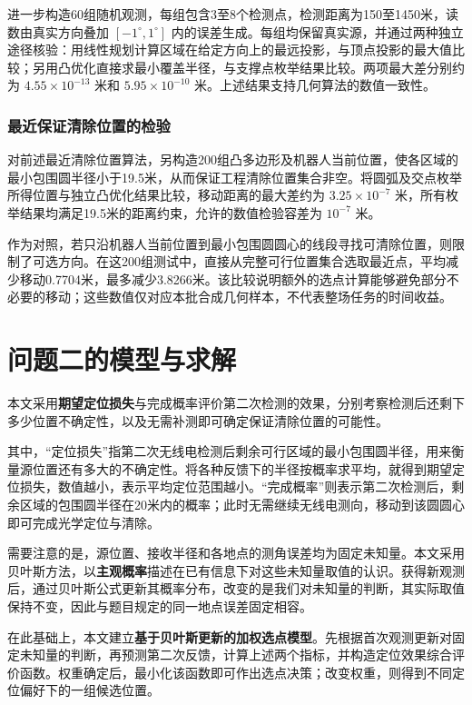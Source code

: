 \documentclass[UTF8,a4paper,zihao=-4,fontset=none]{ctexart}
\begin{document}
进一步构造60组随机观测，每组包含3至8个检测点，检测距离为150至1450米，读数由真实方向叠加 \([-1^\circ,1^\circ]\) 内的误差生成。每组均保留真实源，并通过两种独立途径核验：用线性规划计算区域在给定方向上的最远投影，与顶点投影的最大值比较；另用凸优化直接求最小覆盖半径，与支撑点枚举结果比较。两项最大差分别约为 \(4.55\times10^{-13}\) 米和 \(5.95\times10^{-10}\) 米。上述结果支持几何算法的数值一致性。

\subsubsection{最近保证清除位置的检验}

对前述最近清除位置算法，另构造200组凸多边形及机器人当前位置，使各区域的最小包围圆半径小于19.5米，从而保证工程清除位置集合非空。将圆弧及交点枚举所得位置与独立凸优化结果比较，移动距离的最大差约为 \(3.25\times10^{-7}\) 米，所有枚举结果均满足19.5米的距离约束，允许的数值检验容差为 \(10^{-7}\) 米。

作为对照，若只沿机器人当前位置到最小包围圆圆心的线段寻找可清除位置，则限制了可选方向。在这200组测试中，直接从完整可行位置集合选取最近点，平均减少移动0.7704米，最多减少3.8266米。该比较说明额外的选点计算能够避免部分不必要的移动；这些数值仅对应本批合成几何样本，不代表整场任务的时间收益。

\section{问题二的模型与求解}

本文采用\textbf{期望定位损失}与{完成概率}评价第二次检测的效果，分别考察检测后还剩下多少位置不确定性，以及无需补测即可确定保证清除位置的可能性。

其中，“定位损失”指第二次无线电检测后剩余可行区域的最小包围圆半径，用来衡量源位置还有多大的不确定性。将各种反馈下的半径按概率求平均，就得到期望定位损失，数值越小，表示平均定位范围越小。“完成概率”则表示第二次检测后，剩余区域的包围圆半径在20米内的概率；此时无需继续无线电测向，移动到该圆圆心即可完成光学定位与清除。

需要注意的是，源位置、接收半径和各地点的测角误差均为固定未知量。本文采用贝叶斯方法，以\textbf{主观概率}描述在已有信息下对这些未知量取值的认识。获得新观测后，通过贝叶斯公式更新其概率分布，改变的是我们对未知量的判断，其实际取值保持不变，因此与题目规定的同一地点误差固定相容。

在此基础上，本文建立\textbf{基于贝叶斯更新的加权选点模型}。先根据首次观测更新对固定未知量的判断，再预测第二次反馈，计算上述两个指标，并构造定位效果综合评价函数。权重确定后，最小化该函数即可作出选点决策；改变权重，则得到不同定位偏好下的一组候选位置。
\end{document}
